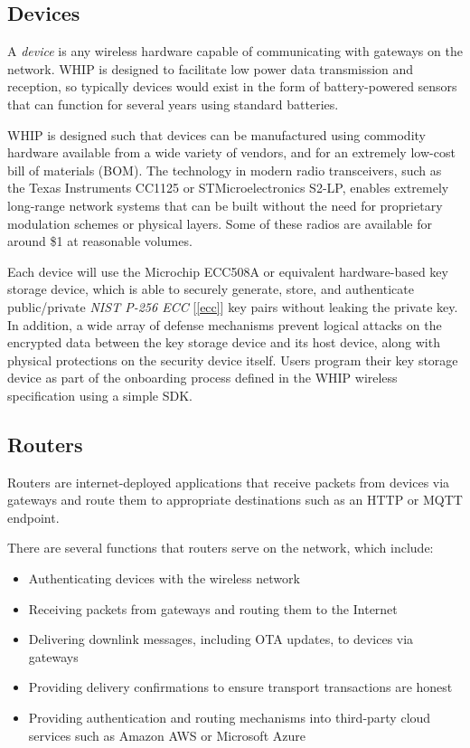 \documentclass[letterpaper,11pt]{article}
\begin{document}
\subsection{Devices}\label{devices}

A \emph{device} is any wireless hardware capable of communicating with gateways on the network. WHIP is designed to facilitate low power data transmission and reception, so typically devices would exist in the form of battery-powered sensors that can function for several years using standard batteries.

WHIP is designed such that devices can be manufactured using commodity hardware available from a wide variety of vendors, and for an extremely low-cost bill of materials (BOM). The technology in modern radio transceivers, such as the Texas Instruments CC1125 or STMicroelectronics S2-LP, enables extremely long-range network systems that can be built without the need for proprietary modulation schemes or physical layers. Some of these radios are available for around \$1 at reasonable volumes.

Each device will use the Microchip ECC508A\cite{ecc} or equivalent hardware-based key storage device, which is able to securely generate, store, and authenticate public/private \emph{NIST P-256 ECC} [\ref{ecc}] key pairs without leaking the private key. In addition, a wide array of defense mechanisms prevent logical attacks on the encrypted data between the key storage device and its host device, along with physical protections on the security device itself. Users program their key storage device as part of the onboarding process defined in the WHIP wireless specification using a simple SDK\@.

\subsection{Routers}

Routers are internet-deployed applications that receive packets from devices via gateways and route them to appropriate destinations such as an HTTP or MQTT endpoint.

There are several functions that routers serve on the network, which include:

\begin{itemize}
    \item Authenticating devices with the wireless network
    \item Receiving packets from gateways and routing them to the Internet
    \item Delivering downlink messages, including OTA updates, to devices via gateways
    \item Providing delivery confirmations to ensure transport transactions are honest
    \item Providing authentication and routing mechanisms into third-party cloud services such as Amazon AWS or Microsoft Azure
\end{itemize}
\end{document}
